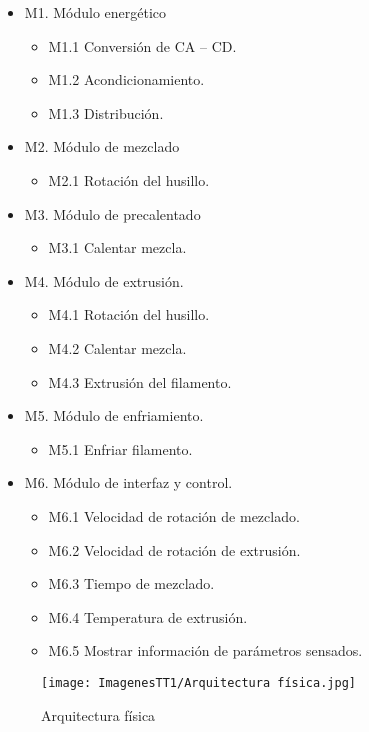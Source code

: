 \documentclass[14pt,oneside]{extarticle} %
\begin{document}
\begin{itemize}
    \item M1. Módulo energético 
    \begin{itemize}
        \item M1.1 Conversión de CA – CD.
        \item M1.2 Acondicionamiento. 
        \item M1.3 Distribución.
    \end{itemize}
    \item M2. Módulo de mezclado
    \begin{itemize}
        \item M2.1 Rotación del husillo.
    \end{itemize}
    \item M3. Módulo de precalentado
    \begin{itemize}
        \item M3.1 Calentar mezcla.
    \end{itemize}
    \item M4. Módulo de extrusión.
    \begin{itemize}
        \item M4.1 Rotación del husillo.
        \item M4.2 Calentar mezcla.
        \item M4.3 Extrusión del filamento.
    \end{itemize}
    \item M5. Módulo de enfriamiento.
    \begin{itemize}
        \item M5.1 Enfriar filamento. 
    \end{itemize}
    \item M6. Módulo de interfaz y control.
    \begin{itemize}
        \item M6.1 Velocidad de rotación de mezclado.
        \item M6.2 Velocidad de rotación de extrusión.
        \item M6.3 Tiempo de mezclado.
        \item M6.4 Temperatura de extrusión.
        \item M6.5 Mostrar información de parámetros sensados.
    \end{itemize}
\end{itemize}
\begin{figure}[H]
    \centering
    \texttt{[image: ImagenesTT1/Arquitectura física.jpg]}
    \caption{Arquitectura física}
    \label{fig:arquitecturafisica}
\end{figure}
\end{document}
